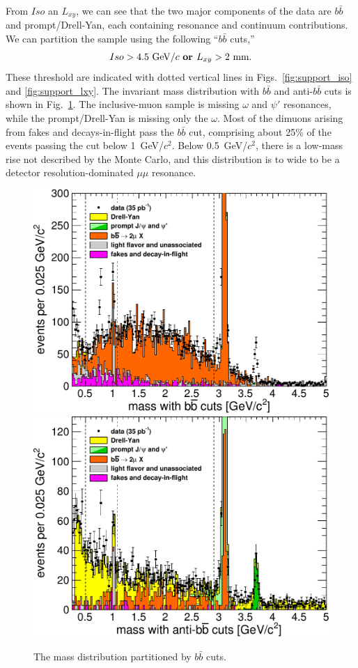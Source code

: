 \documentclass[12pt]{cms-tdr}
\begin{document}
From $Iso$ an $L_{xy}$, we can see that the two major components of
the data are $b\bar{b}$ and prompt/Drell-Yan, each containing
resonance and continuum contributions.  We can partition the sample
using the following ``$b\bar{b}$ cuts,''
\begin{equation}
Iso > 4.5\mbox{ GeV/$c$ {\bf or }} L_{xy} > \mbox{2 mm.}
\label{eqn:bbcuts}
\end{equation}
These threshold are indicated with dotted vertical lines in
Figs.~\ref{fig:support_iso} and \ref{fig:support_lxy}.  The invariant
mass distribution with $b\bar{b}$ and anti-$b\bar{b}$ cuts is shown in
Fig.~\ref{fig:support_mass}.  The inclusive-muon sample is missing
$\omega$ and $\psi'$ resonances, while the prompt/Drell-Yan is missing
only the $\omega$.  Most of the dimuons arising from fakes and
decays-in-flight pass the $b\bar{b}$ cut, comprising about 25\% of the
events passing the cut below 1~GeV/$c^2$.  Below 0.5~GeV/$c^2$, there
is a low-mass rise not described by the Monte Carlo, and this
distribution is to wide to be a detector resolution-dominated $\mu\mu$
resonance.

\begin{figure}
\includegraphics[width=0.5\linewidth]{PLOTS/support_mass_bbbar.pdf}
\includegraphics[width=0.5\linewidth]{PLOTS/support_mass_antibbbar.pdf}

\caption{The mass distribution partitioned by $b\bar{b}$ cuts. \label{fig:support_mass}}
\end{figure}

\end{document}
